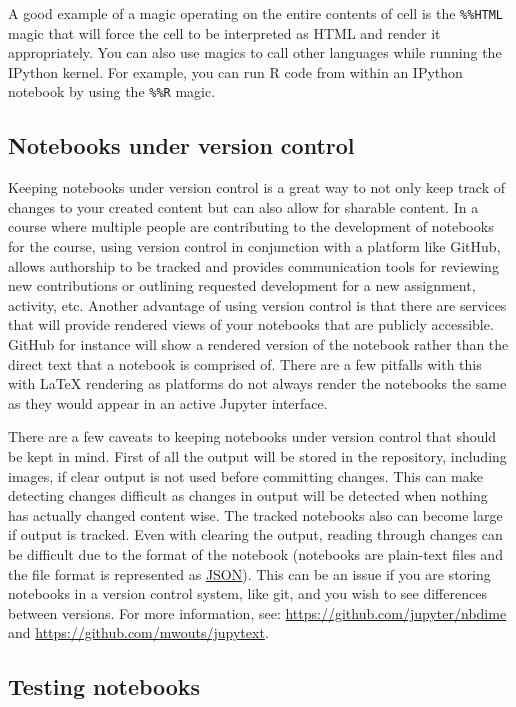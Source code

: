 \documentclass[]{book}
\begin{document}
A good example of a magic operating on the entire contents of cell is
the \texttt{\%\%HTML} magic that will force the cell to be interpreted
as HTML and render it appropriately. You can also use magics to call
other languages while running the IPython kernel. For example, you can
run R code from within an IPython notebook by using the \texttt{\%\%R}
magic.

\subsection{Notebooks under version
control}\label{notebooks-under-version-control}

Keeping notebooks under version control is a great way to not only keep
track of changes to your created content but can also allow for sharable
content. In a course where multiple people are contributing to the
development of notebooks for the course, using version control in
conjunction with a platform like GitHub, allows authorship to be tracked
and provides communication tools for reviewing new contributions or
outlining requested development for a new assignment, activity, etc.
Another advantage of using version control is that there are services
that will provide rendered views of your notebooks that are publicly
accessible. GitHub for instance will show a rendered version of the
notebook rather than the direct text that a notebook is comprised of.
There are a few pitfalls with this with LaTeX rendering as platforms do
not always render the notebooks the same as they would appear in an
active Jupyter interface.

There are a few caveats to keeping notebooks under version control that
should be kept in mind. First of all the output will be stored in the
repository, including images, if clear output is not used before
committing changes. This can make detecting changes difficult as changes
in output will be detected when nothing has actually changed content
wise. The tracked notebooks also can become large if output is tracked.
Even with clearing the output, reading through changes can be difficult
due to the format of the notebook (notebooks are plain-text files and
the file format is represented as \href{https://www.json.org/}{JSON}).
This can be an issue if you are storing notebooks in a version control
system, like git, and you wish to see differences between versions. For
more information, see: \url{https://github.com/jupyter/nbdime} and
\url{https://github.com/mwouts/jupytext}.

\subsection{Testing notebooks}\label{testing-notebooks}
\end{document}

